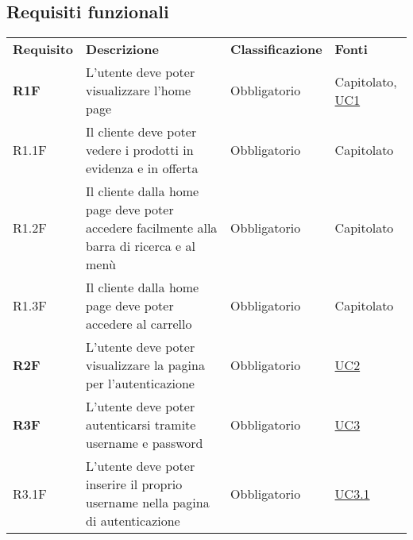 \subsection{Requisiti funzionali}
\begin{center}
    \centering
    \renewcommand{\arraystretch}{1.8}
    \label{tab:RequisitiFunzionali}
    \begin{longtable}[!h]{p{50px} p{245px} p{75px} p{50px}}
        \rowcolor{logo!70} \textbf{Requisito} & \textbf{Descrizione}                                                                                       & \textbf{Classificazione} & \textbf{Fonti}                               \\
        \textbf{R1F}                          & L'utente deve poter visualizzare l'home page                                                               & Obbligatorio             & Capitolato, \newline \hyperref[sec:UC1]{UC1} \\
        R1.1F                                 & Il cliente deve poter vedere i prodotti in evidenza e in offerta                                           & Obbligatorio             & Capitolato                                   \\
        R1.2F                                 & Il cliente dalla home page deve poter accedere facilmente alla barra di ricerca e al menù                  & Obbligatorio             & Capitolato                                   \\
        R1.3F                                 & Il cliente dalla home page deve poter accedere al carrello                                                 & Obbligatorio             & Capitolato                                   \\
        \textbf{R2F}                          & L'utente deve poter visualizzare la pagina per l'autenticazione                                            & Obbligatorio             & \hyperref[sec:UC2]{UC2}                      \\
        \textbf{R3F}                          & L'utente deve poter autenticarsi tramite username e password                                               & Obbligatorio             & \hyperref[sec:UC3]{UC3}                      \\
        R3.1F                                 & L'utente deve poter inserire il proprio username nella pagina di autenticazione                            & Obbligatorio             & \hyperref[sec:UC3.1]{UC3.1}                  \\

\end{longtable}
\end{center}
